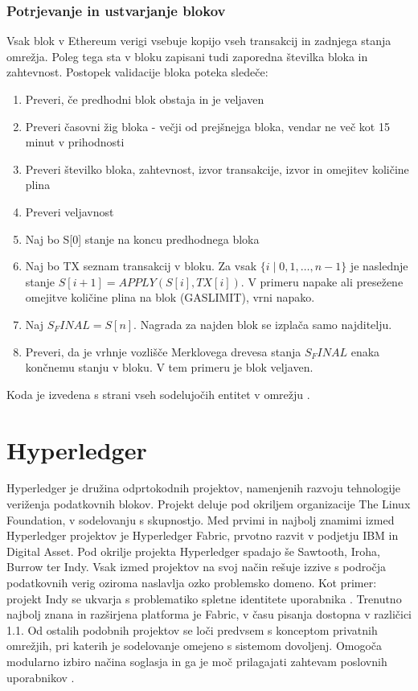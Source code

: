\documentclass[a4paper, 12pt]{book}
\begin{document}
\subsubsection{Potrjevanje in ustvarjanje blokov}
Vsak blok v Ethereum verigi vsebuje kopijo vseh transakcij in zadnjega stanja omrežja.
Poleg tega sta v bloku zapisani tudi zaporedna številka bloka in zahtevnost.
Postopek validacije bloka poteka sledeče:
\begin{enumerate}
\item Preveri, če predhodni blok obstaja in je veljaven
\item Preveri časovni žig bloka - večji od prejšnejga bloka, vendar ne več kot 15 minut v prihodnosti
\item Preveri številko bloka, zahtevnost, izvor transakcije, izvor  in omejitev količine plina
\item Preveri veljavnost 
\item Naj bo S[0] stanje na koncu predhodnega bloka
\item Naj bo TX seznam transakcij v bloku. Za vsak 
$\{i \mid 0,1,\dots, n-1\}$
je naslednje stanje
 $S[i+1] = APPLY(S[i], TX[i])$.
V primeru napake ali presežene omejitve količine plina na blok (GASLIMIT), vrni napako.
\item Naj $S_FINAL = S[n]$. Nagrada za najden blok se izplača samo najditelju.
\item Preveri, da je vrhnje vozlišče Merklovega drevesa stanja $S_FINAL$ enaka končnemu stanju v bloku. V tem primeru je blok veljaven.
\end{enumerate}

Koda je izvedena s strani vseh sodelujočih entitet v omrežju \cite{ethereumWhitepaper}.

\section{Hyperledger}
Hyperledger je družina odprtokodnih projektov, namenjenih razvoju tehnologije veriženja podatkovnih blokov.
Projekt deluje pod okriljem organizacije The Linux Foundation, v sodelovanju s skupnostjo.
Med prvimi in najbolj znamimi izmed Hyperledger projektov je Hyperledger Fabric, prvotno razvit v podjetju IBM in Digital Asset.
Pod okrilje projekta Hyperledger spadajo še Sawtooth, Iroha, Burrow ter Indy.
Vsak izmed projektov na svoj način rešuje izzive s področja podatkovnih verig oziroma naslavlja ozko problemsko domeno. Kot primer: projekt Indy se ukvarja s problematiko spletne identitete uporabnika \cite{hyperledgerWeb}.
Trenutno najbolj znana in razširjena platforma je Fabric, v času pisanja dostopna v različici 1.1.
Od ostalih podobnih projektov se loči predvsem s konceptom privatnih omrežjih, pri katerih je sodelovanje omejeno s sistemom dovoljenj.
Omogoča modularno izbiro načina soglasja in ga je moč prilagajati zahtevam poslovnih uporabnikov \cite{hyperledgerIbm}.
\end{document}
